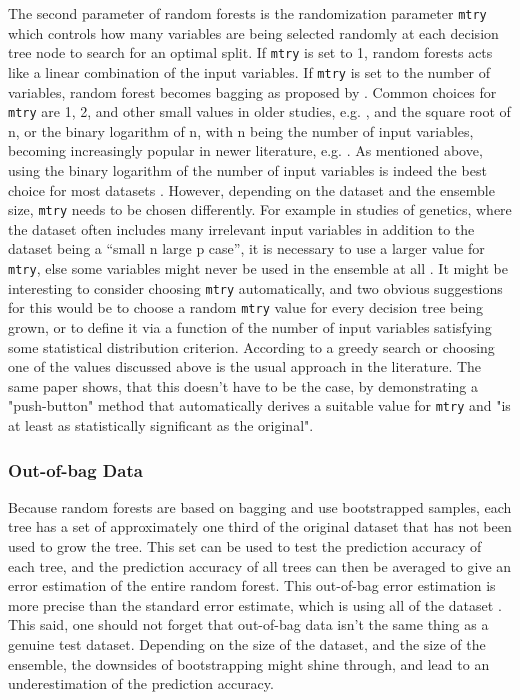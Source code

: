 \documentclass[a4paper,man,12pt,apacite,floatsintext,draftfirst]{apa6} %
\begin{document}
The second parameter of random forests is the randomization parameter
\texttt{mtry} which controls how many variables are being selected randomly
at each decision tree node to search for an optimal split.
If \texttt{mtry} is set to 1, random forests acts like a linear combination
of the input variables.
If \texttt{mtry} is set to the number of variables, random forest becomes
bagging as proposed by \cite{breiman1996bagging}.
Common choices for \texttt{mtry} are 1, 2, and other small values in
older studies, e.g. \cite{breiman2001random}, and the square root of n,
or the binary logarithm of n, with n being the number of input variables,
becoming increasingly popular in newer literature, e.g.
\cite{strobl2009introduction}.
As mentioned above, using the binary logarithm of the number of
input variables is indeed the best choice for most datasets
\cite{banfield2007comparison}.
However, depending on the dataset and the ensemble size, \texttt{mtry}
needs to be chosen differently.
For example in studies of genetics, where the dataset often includes many
irrelevant input variables in addition to the dataset being a
“small n large p case”, it is necessary to use a larger value
for \texttt{mtry}, else some variables might never be used in the ensemble
at all \cite{strobl2009introduction}.
It might be interesting to consider choosing \texttt{mtry} automatically,
and two obvious suggestions for this would be to choose a random \texttt{mtry}
value for every decision tree being grown, or to define it via a function of the
number of input variables satisfying some statistical distribution criterion.
According to \cite{bernard2008forest} a greedy search or choosing one of
the values discussed above is the usual approach in the literature.
The same paper shows, that this doesn't have to be the case, by demonstrating
a "push-button" method that automatically derives a suitable value for
\texttt{mtry} and "is at least as statistically significant as the original".

\subsubsection{Out-of-bag Data}
Because random forests are based on bagging and use bootstrapped samples,
each tree has a set of approximately one third of the original dataset
that has not been used to grow the tree.
This set can be used to test the prediction accuracy of each tree,
and the prediction accuracy of all trees can then be averaged to give an
error estimation of the entire random forest.
This out-of-bag error estimation is more precise than the standard error
estimate, which is using all of the dataset \cite{strobl2009introduction}.
This said, one should not forget that out-of-bag data isn't the
same thing as a genuine test dataset.
Depending on the size of the dataset, and the size of the ensemble,
the downsides
of bootstrapping might shine through, and lead to an underestimation of
the prediction accuracy.
\end{document}

